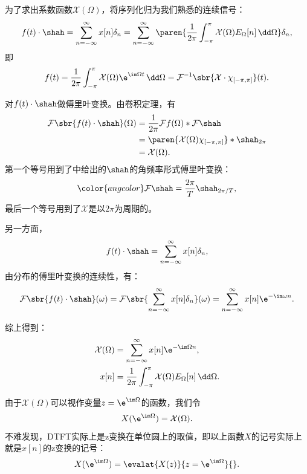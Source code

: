 为了求出系数函数$\mathcal{X}(\Omega)$，将序列化归为我们熟悉的连续信号：
\begin{equation}
    f(t)\cdot\shah=\sum_{n=-\infty}^{\infty}x[n]\delta_{n}=\sum_{n=-\infty}^{\infty}\paren{\frac{1}{2\pi}\int_{-\pi}^{\pi}\mathcal{X}(\Omega)E_{\Omega}[n]\,\dd\Omega}\delta_{n},
\end{equation}
即
\begin{equation}
    f(t)=\frac{1}{2\pi}\int_{-\pi}^{\pi}\mathcal{X}(\Omega)\e^{\im\Omega t}\,\dd\Omega=\mathcal{F}^{-1}\sbr{\mathcal{X}\cdot\chi_{[-\pi,\pi]}}(t).
\end{equation}

对$f(t)\cdot\shah$做傅里叶变换。由卷积定理，有
\begin{align}
    \mathcal{F}\sbr{f(t)\cdot\shah}(\Omega)&=\frac{1}{2\pi}\mathcal{F} f(\Omega)*\mathcal{F}\shah \nonumber \\
    &=\paren{\mathcal{X}(\Omega)\chi_{[-\pi,\pi]}}*\shah_{2\pi} \nonumber \\
    &=\mathcal{X}(\Omega).
\end{align}
第一个等号用到了中给出的$\shah$的角频率形式傅里叶变换：
\begin{equation}
    {\color{angcolor}\mathcal{F}\shah=\frac{2\pi}{T}\shah_{2\pi/T},}
\end{equation}
最后一个等号用到了$\mathcal{X}$是以$2\pi$为周期的。

另一方面，
\begin{equation}
    f(t)\cdot\shah=\sum_{n=-\infty}^{\infty}x[n]\delta_{n},
\end{equation}
由分布的傅里叶变换的连续性，有：
\begin{equation}
    \mathcal{F}\sbr{f(t)\cdot\shah}(\omega)=\mathcal{F}\sbr{\sum_{n=-\infty}^{\infty}x[n]\delta_{n}}(\omega)=\sum_{n=-\infty}^{\infty}x[n]\e^{-\im\omega n}.
\end{equation}

综上得到：
\begin{align}
    \mathcal{X}(\Omega)&=\sum_{n=-\infty}^{\infty}x[n]\e^{-\im\Omega n}, \\
    x[n]&=\frac{1}{2\pi}\int_{-\pi}^{\pi}\mathcal{X}(\Omega)E_{\Omega}[n]\,\dd\Omega.
\end{align}

由于$\mathcal{X}(\Omega)$可以视作变量$z=\e^{\im\Omega}$的函数，我们令
\begin{equation}
    X(\e^{\im\Omega})=\mathcal{X}(\Omega).
\end{equation}
不难发现，DTFT实际上是z变换在单位圆上的取值，即以上函数$X$的记号实际上就是$x[n]$的z变换的记号：
\begin{equation}
    X(\e^{\im\Omega})=\evalat{X(z)}{z=\e^{\im\Omega}}{}.
\end{equation}

